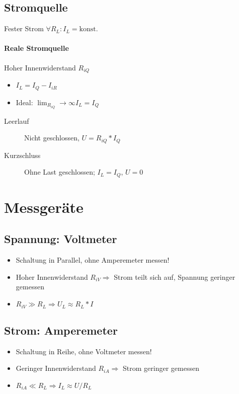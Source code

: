 \subsection{Stromquelle}

Fester Strom $\forall R_L: I_L = \text{konst.}$

\paragraph{Reale Stromquelle} Hoher Innenwiderstand $R_{iQ}$

\begin{itemize}
  \item $I_L = I_Q - I_{iR}$
  \item Ideal: $\lim_{R_{iQ}} \rightarrow \infty I_L = I_Q$
\end{itemize}

\begin{description}
  \item[Leerlauf] Nicht geschlossen, $U = R_{iQ} * I_Q$
  \item[Kurzschluss] Ohne Last geschlossen; $I_L = I_Q$, $U = 0$
\end{description}

\section{Messgeräte}

\subsection{Spannung: Voltmeter}

\begin{itemize}
  \item Schaltung in Parallel, ohne Amperemeter messen!
  \item Hoher Innenwiderstand $R_{iV} \Rightarrow$ Strom teilt sich auf, Spannung geringer gemessen
  \item $R_{iV} \gg R_L \Rightarrow U_L \approx R_L * I$
\end{itemize}

\subsection{Strom: Amperemeter}

\begin{itemize}
  \item Schaltung in Reihe, ohne Voltmeter messen!
  \item Geringer Innenwiderstand $R_{iA} \Rightarrow$ Strom geringer gemessen
  \item $R_{iA} \ll R_L \Rightarrow I_L \approx U/R_L$
\end{itemize}

